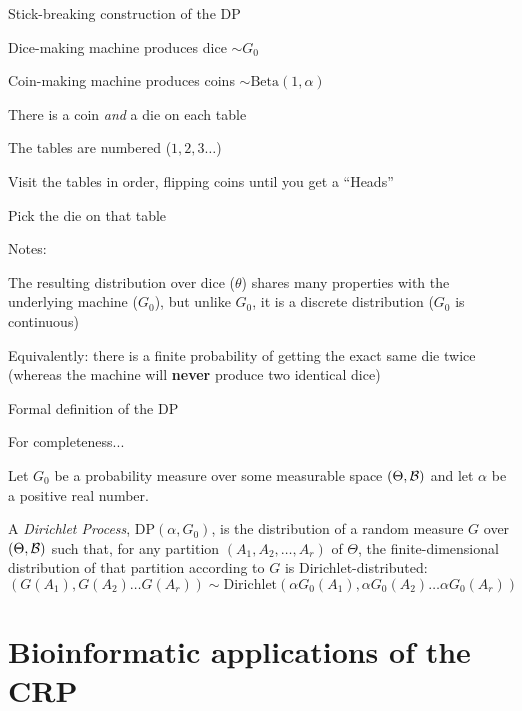 \documentclass{beamer}
\begin{document}
\begin{frame}{Stick-breaking construction of the DP}

\itemb
\item Dice-making machine produces dice $\sim G_0$
\item Coin-making machine produces coins $\sim \mbox{Beta}(1,\alpha)$
\item There is a coin {\em and} a die on each table
\item The tables are numbered ($1, 2, 3 \ldots$)
\item Visit the tables in order, flipping coins until you get a ``Heads''
\item Pick the die on that table
\iteme

Notes:
\itemb
\item The resulting distribution over dice ($\theta$) shares many properties with the underlying machine ($G_0$),
but unlike $G_0$, it is a \alert{discrete} distribution ($G_0$ is \alert{continuous})
\item Equivalently: there is a finite probability of getting the exact same die twice (whereas the machine will {\bf never} produce two identical dice)
\iteme

\end{frame}



\begin{frame}{Formal definition of the DP}

For completeness...

\vspace{.5\baselineskip}

Let $G_0$ be a probability measure over some measurable space $(\Theta,{\cal B})$ and let $\alpha$ be a positive real number.

\vspace{.5\baselineskip}

A {\em Dirichlet Process}, DP$(\alpha,G_0)$, is the distribution of a random measure $G$ over $(\Theta,{\cal B})$
such that, for any partition $(A_1, A_2, \ldots, A_r)$ of $\Theta$, the finite-dimensional distribution of that partition according to $G$ is Dirichlet-distributed:
\[
(G(A_1),G(A_2) \ldots G(A_r)) \sim \mbox{Dirichlet}(\alpha G_0(A_1), \alpha G_0(A_2) \ldots \alpha G_0(A_r))
\]


\end{frame}



\section{Bioinformatic applications of the CRP}
\end{document}
